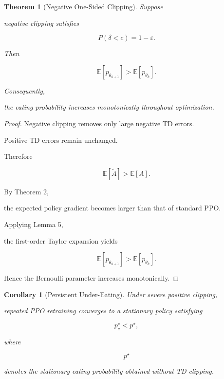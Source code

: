 \documentclass[11pt]{article}
\newtheorem{theorem}{Theorem}
\newtheorem{corollary}{Corollary}
\begin{document}

\begin{theorem}[Negative One-Sided Clipping]

Suppose

negative clipping satisfies

\[
P(\delta<c)
=
1-\varepsilon.
\]

Then

\[
\mathbb E
[
p_{\theta_{k+1}}
]
>
\mathbb E
[
p_{\theta_k}
].
\]

Consequently,

the eating probability increases monotonically throughout
optimization.

\end{theorem}

\begin{proof}

Negative clipping removes only large negative TD errors.

Positive TD errors remain unchanged.

Therefore

\[
\mathbb E
[
\widetilde A
]
>
\mathbb E
[
A
].
\]

By Theorem 2,

the expected policy gradient becomes larger than that of
standard PPO.

Applying Lemma 5,

the first-order Taylor expansion yields

\[
\mathbb E
[
p_{\theta_{k+1}}
]
>
\mathbb E
[
p_{\theta_k}
].
\]

Hence the Bernoulli parameter increases monotonically.

\end{proof}


\begin{corollary}[Persistent Under-Eating]

Under severe positive clipping,

repeated PPO retraining converges to a stationary policy satisfying

\[
p^\star_c
<
p^\star,
\]

where

\[
p^\star
\]

denotes the stationary eating probability obtained without
TD clipping.

\end{corollary}
\end{document}
